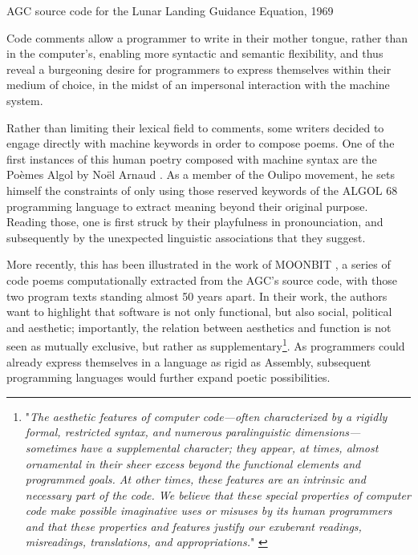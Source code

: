 \begin{listing}
  \inputminted{ca65}{./corpus/numero_mysterioso.asm}
  \caption{AGC source code for the Lunar Landing Guidance Equation, 1969}
  \label{code:numero_mysterioso_asm}
\end{listing}

Code comments allow a programmer to write in their mother tongue, rather than in the computer's, enabling more syntactic and semantic flexibility, and thus reveal a burgeoning desire for programmers to express themselves within their medium of choice, in the midst of an impersonal interaction with the machine system.

Rather than limiting their lexical field to comments, some writers decided to engage directly with machine keywords in order to compose poems. One of the first instances of this human poetry composed with machine syntax are the Poèmes Algol by Noël Arnaud \citep{arnaud_poemes_1968}. As a member of the Oulipo movement, he sets himself the constraints of only using those reserved keywords of the ALGOL 68 programming language to extract meaning beyond their original purpose. Reading those, one is first struck by their playfulness in pronounciation, and subsequently by the unexpected linguistic associations that they suggest.

More recently, this has been illustrated in the work of MOONBIT \citep{mosteirin_moonbit_2019}, a series of code poems computationally extracted from the AGC's source code, with those two program texts standing almost 50 years apart. In their work, the authors want to highlight that software is not only functional, but also social, political and aesthetic; importantly, the relation between aesthetics and function is not seen as mutually exclusive, but rather as supplementary\footnote{"\emph{The aesthetic features of computer code—often characterized by a rigidly formal, restricted syntax, and numerous paralinguistic dimensions—sometimes have a supplemental character; they appear, at times, almost ornamental in their sheer excess beyond the functional elements and programmed goals. At other times, these features are an intrinsic and necessary part of the code. We believe that these special properties of computer code make possible imaginative uses or misuses by its human programmers and that these properties and features justify our exuberant readings, misreadings, translations, and appropriations.}" \citep{mosteirin_moonbit_2019}}. As programmers could already express themselves in a language as rigid as Assembly, subsequent programming languages would further expand poetic possibilities.

